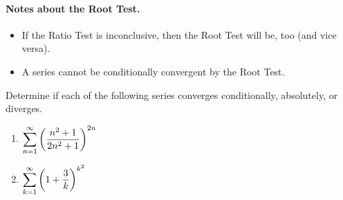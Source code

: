 \documentclass[12pt]{article}
\begin{document}
\paragraph*{Notes about the Root Test.}
\begin{itemize}
	\item If the Ratio Test is inconclusive, then the Root Test will be, too (and vice versa).
	\item A series cannot be conditionally convergent by the Root Test.
\end{itemize}

\Examples Determine if each of the following series converges conditionally, absolutely, or diverges.

\begin{enumerate}
\item[\tc{1}] $\displaystyle\sum_{n=1}^\infty\left(\dfrac{n^2+1}{2n^2+1}\right)^{2n}$

\vfill 

\item[\tc{2}] $\displaystyle\sum_{k=1}^\infty\left(1+\dfrac{3}{k}\right)^{k^2}$

\vfill

\end{enumerate}
\end{document}
